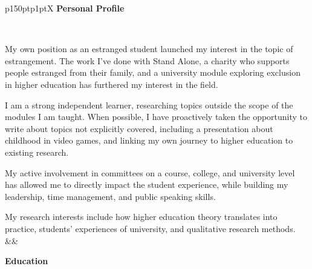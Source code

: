 \documentclass[hidelinks, 12pt, a4paper]{article}
\begin{document}
	\noindent
	\begin{table}[h!]
		\begin{tabularx}{\textwidth}{p{150pt}p{1pt}X}
			{\noindent\Large\textbf{Personal Profile}}
			
			\vspace{4pt}\
			 
			 My own position as an estranged student launched my interest in the topic of estrangement. The work I've done with Stand Alone, a charity who supports people estranged from their family, and a university module exploring exclusion in higher education has furthered my interest in the field.\newline
			 
			 I am a strong independent learner, researching topics outside the scope of the modules I am taught. When possible, I have proactively taken the opportunity to write about topics not explicitly covered, including a presentation about childhood in video games, and linking my own journey to higher education to existing research.\newline
			 
			 My active involvement in committees on a course, college, and university level has allowed me to directly impact the student experience, while building my leadership, time management, and public speaking skills.\newline
			 
			 My research interests include how higher education theory translates into practice, students' experiences of university, and qualitative research methods.
			&&
			
			\begin{minipage}[t]{\linewidth}
				
				{\noindent\hspace{3pt}\Large\textbf{Education}}
				

\end{minipage}
\end{tabularx}
\end{table}
\end{document}
